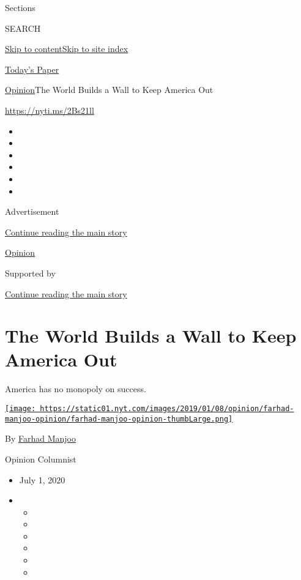 Sections

SEARCH

\protect\hyperlink{site-content}{Skip to
content}\protect\hyperlink{site-index}{Skip to site index}

\href{https://myaccount.nytimes.com/auth/login?response_type=cookie\&client_id=vi}{}

\href{https://www.nytimes.com/section/todayspaper}{Today's Paper}

\href{/section/opinion}{Opinion}\textbar{}The World Builds a Wall to
Keep America Out

\href{https://nyti.ms/2Bs21ll}{https://nyti.ms/2Bs21ll}

\begin{itemize}
\item
\item
\item
\item
\item
\item
\end{itemize}

Advertisement

\protect\hyperlink{after-top}{Continue reading the main story}

\href{/section/opinion}{Opinion}

Supported by

\protect\hyperlink{after-sponsor}{Continue reading the main story}

\hypertarget{the-world-builds-a-wall-to-keep-america-out}{%
\section{The World Builds a Wall to Keep America
Out}\label{the-world-builds-a-wall-to-keep-america-out}}

America has no monopoly on success.

\href{https://www.nytimes.com/by/farhad-manjoo}{\texttt{[image: https://static01.nyt.com/images/2019/01/08/opinion/farhad-manjoo-opinion/farhad-manjoo-opinion-thumbLarge.png]}}

By \href{https://www.nytimes.com/by/farhad-manjoo}{Farhad Manjoo}

Opinion Columnist

\begin{itemize}
\item
  July 1, 2020
\item
  \begin{itemize}
  \item
  \item
  \item
  \item
  \item
  \item
  \end{itemize}
\end{itemize}

